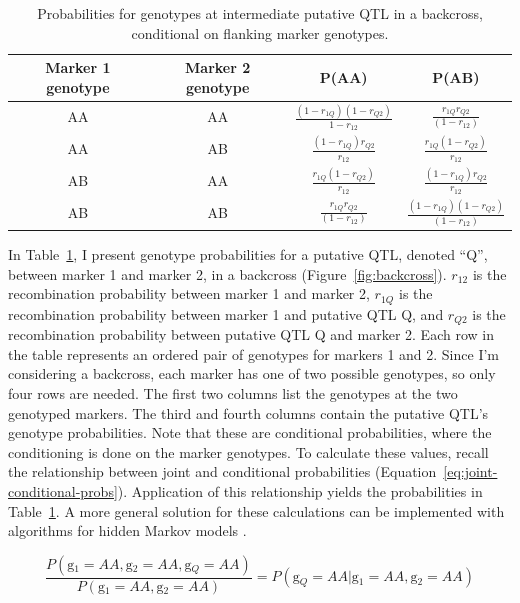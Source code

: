 \documentclass[oneside]{book}\usepackage[]{graphicx}\usepackage[]{color}
\begin{document}
\begin{table}
\caption{Probabilities for genotypes at intermediate putative QTL in a backcross, conditional on flanking marker genotypes.}\label{tab:genoprob}
\begin{tabular}{cccc}
\hline
Marker 1 genotype & Marker 2 genotype & P(AA) & P(AB) \\
\hline
AA & AA & $\frac{(1- r_{1Q})(1-r_{Q2})}{1-r_{12}}$ & $\frac{r_{1Q}r_{Q2}}{(1-r_{12})}$ \\
AA & AB & $\frac{(1-r_{1Q})r_{Q2}}{r_{12}}$ & $\frac{r_{1Q}(1-r_{Q2})}{r_{12}}$ \\
AB & AA & $\frac{r_{1Q}(1-r_{Q2})}{r_{12}}$ & $\frac{(1-r_{1Q})r_{Q2}}{r_{12}}$ \\
AB & AB & $\frac{r_{1Q}r_{Q2}}{(1-r_{12})}$ & $\frac{(1-r_{1Q})(1-r_{Q2})}{(1-r_{12})}$\\
\hline
\end{tabular}
\end{table}

In Table~\ref{tab:genoprob}, I present genotype probabilities for a putative QTL, denoted ``Q'', 
between marker 1 and marker 2, in a backcross (Figure~\ref{fig:backcross}). $r_{12}$ is the 
recombination probability between marker 1 and marker 2, $r_{1Q}$ is the recombination probability
between marker 1 and putative QTL Q, and $r_{Q2}$ is the recombination probability between 
putative QTL Q and marker 2. 
Each row in the table represents an ordered pair of genotypes for markers 1 and 2. Since I'm 
considering a backcross, each marker has one of two possible genotypes, so only four rows are 
needed. The first two columns list the genotypes at the two genotyped markers. The third and 
fourth columns contain the putative QTL's genotype probabilities. Note that these are 
conditional probabilities, where the conditioning is done on the marker genotypes. To calculate 
these values, recall the relationship between joint and conditional probabilities
(Equation~\ref{eq:joint-conditional-probs}). Application of this relationship yields 
the probabilities in Table~\ref{tab:genoprob}. A more general solution for 
these calculations can be implemented with algorithms for hidden Markov 
models \citep{broman2009guide, broman2006use}.

\begin{equation}
\frac{P(\text{g$_1$} = AA, \text{g$_2$}=AA, \text{g$_Q$}=AA)}{P(\text{g$_1$} = AA, \text{g$_2$}=AA)} = P(\text{g$_Q$} = AA|\text{g$_1$} = AA, \text{g$_2$}=AA)
\label{eq:joint-conditional-probs}
\end{equation}
\end{document}

